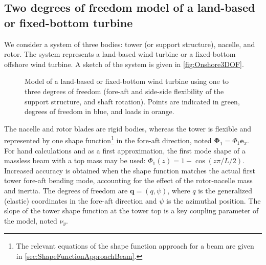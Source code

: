 \documentclass[wes, manuscript]{copernicus}
\renewcommand{\v}[1]{\boldsymbol{#1}}
\begin{document}




\subsection{Two degrees of freedom model of a land-based or fixed-bottom turbine}
\label{sec:Onshore1DOF}\label{sec:Onshore2DOF}
We consider a system of three bodies: tower (or support structure), nacelle, and rotor.
The system represents a land-based wind turbine or a fixed-bottom offshore wind turbine. 
A sketch of the system is given in \autoref{fig:Onshore3DOF}. 
\begin{figure}[!htb]%
 \centering%
 \def\svgwidth{0.6\columnwidth}%
 \caption{Model of a land-based or fixed-bottom wind turbine using one to three degrees of freedom (fore-aft and side-side flexibility of the support structure, and shaft rotation). Points are indicated in green, degrees of freedom in blue, and loads in orange.}\label{fig:Onshore3DOF}%
 \end{figure}%
The nacelle and rotor blades are rigid bodies, whereas the tower is flexible and represented by one shape function\footnote{
The relevant equations of the shape function approach for a beam are given in \autoref{sec:ShapeFunctionApproachBeam}.} in the fore-aft direction, noted $\v{\Phi}_1=\Phi_1 \v{e}_x$.
For hand calculations and as a first approximation, the first mode shape of a massless beam with a top mass may be used: $\Phi_1(z)=1-\cos(z\pi/L/2)$.
Increased accuracy is obtained when the shape function matches the actual first tower fore-aft bending mode, accounting for the effect of the rotor-nacelle mass and inertia.
    The degrees of freedom are $\v{q}=(q, \psi)$, where $q$ is the generalized (elastic) coordinates in the fore-aft direction and $\psi$ is the azimuthal position.
The slope of the tower shape function at the tower top is a key coupling parameter of the model, noted  $\nu_y$.
\end{document}
